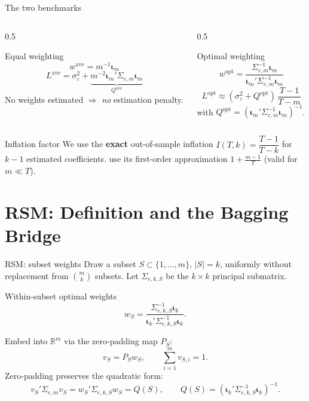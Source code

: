 \documentclass[11pt,aspectratio=169]{beamer}
\newcommand{\Sig}{\Sigma_{e,m}}
\newcommand{\Sigk}{\Sigma_{e,k,S}}
\newcommand{\wopt}{w^{\mathrm{opt}}}
\newcommand{\wave}{w^{\mathrm{ave}}}
\newcommand{\Qopt}{Q^{\mathrm{opt}}}
\newcommand{\Qave}{Q^{\mathrm{ave}}}
\newcommand{\Lopt}{L^{\mathrm{opt}}}
\newcommand{\Lave}{L^{\mathrm{ave}}}
\newcommand{\im}{\bm{\iota}_m}
\newcommand{\ik}{\bm{\iota}_k}
\begin{document}
\begin{frame}{The two benchmarks}
  \begin{columns}[T]
    \begin{column}{0.5\textwidth}
      \begin{block}{Equal weighting}
        \[
          \wave=m^{-1}\im
        \]
        \[
          \Lave=\sigma_\varepsilon^2+\underbrace{m^{-2}\im'\Sig\im}_{\Qave}
        \]
        No weights estimated $\Rightarrow$ \emph{no} estimation penalty.
      \end{block}
    \end{column}
    \begin{column}{0.5\textwidth}
      \begin{block}{Optimal weighting}
        \[
          \wopt=\frac{\Sig^{-1}\im}{\im'\Sig^{-1}\im}
        \]
        \[
          \Lopt\approx(\sigma_\varepsilon^2+\Qopt)\,\frac{T-1}{T-m}
        \]
        with $\Qopt=(\im'\Sig^{-1}\im)^{-1}$.
      \end{block}
    \end{column}
  \end{columns}
  \vspace{4pt}
  \begin{alertblock}{Inflation factor}
    We use the \textbf{exact} out-of-sample inflation
    $I(T,k)=\dfrac{T-1}{T-k}$ for $k-1$ estimated coefficients.
    \citet*{ElliottLiao2025} use its first-order approximation
    $1+\tfrac{m-1}{T}$ (valid for $m\ll T$).
  \end{alertblock}
\end{frame}

\section{RSM: Definition and the Bagging Bridge}

\begin{frame}{RSM: subset weights}
  Draw a subset $S\subset\{1,\dots,m\}$, $|S|=k$, uniformly without
  replacement from $\binom{m}{k}$ subsets. Let $\Sigk$ be the $k\times k$
  principal submatrix.

  \begin{block}{Within-subset optimal weights}
    \[
      w_S=\frac{\Sigk^{-1}\ik}{\ik'\Sigk^{-1}\ik}.
    \]
  \end{block}
  Embed into $\mathbb{R}^m$ via the zero-padding map $P_S$:
  \[
    v_S=P_S w_S,\qquad \sum_{i=1}^m v_{S,i}=1 .
  \]
  Zero-padding preserves the quadratic form:
  \[
    v_S'\Sig v_S=w_S'\Sigk w_S=Q(S),\qquad
    Q(S)=(\ik'\Sigk^{-1}\ik)^{-1}.
  \]
\end{frame}
\end{document}
